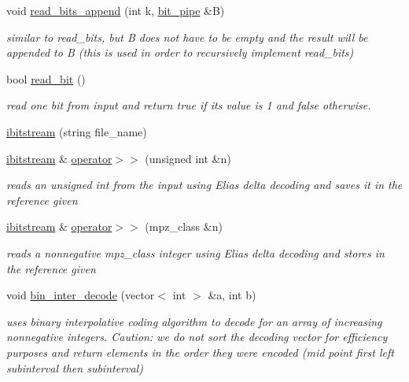 \begin{DoxyCompactItemize}
void \hyperlink{classibitstream_acec2e9efa21551ce8db784f5b0bbd1b5}{read\+\_\+bits\+\_\+append} (int k, \hyperlink{classbit__pipe}{bit\+\_\+pipe} \&B)
\begin{DoxyCompactList}\small\item\em similar to read\+\_\+bits, but B does not have to be empty and the result will be appended to B (this is used in order to recursively implement read\+\_\+bits) \end{DoxyCompactList}\item 
bool \hyperlink{classibitstream_a895239acf7179f6778388c39c97643e4}{read\+\_\+bit} ()
\begin{DoxyCompactList}\small\item\em read one bit from input and return true if its value is 1 and false otherwise. \end{DoxyCompactList}\item 
\hyperlink{classibitstream_af5f00b64072ed3ffe495b7712a71e3eb}{ibitstream} (string file\+\_\+name)
\item 
\hyperlink{classibitstream}{ibitstream} \& \hyperlink{classibitstream_ae3e91ecc9ff17eef98d72d44aec02eca}{operator$>$$>$} (unsigned int \&n)
\begin{DoxyCompactList}\small\item\em reads an unsigned int from the input using Elias delta decoding and saves it in the reference given \end{DoxyCompactList}\item 
\hyperlink{classibitstream}{ibitstream} \& \hyperlink{classibitstream_a0264d01fa1211c4bb73f5de2bc68adbc}{operator$>$$>$} (mpz\+\_\+class \&n)
\begin{DoxyCompactList}\small\item\em reads a nonnegative mpz\+\_\+class integer using Elias delta decoding and stores in the reference given \end{DoxyCompactList}\item 
void \hyperlink{classibitstream_a4d1bfd02f98f6af2ac4d80034b23e26d}{bin\+\_\+inter\+\_\+decode} (vector$<$ int $>$ \&a, int b)
\begin{DoxyCompactList}\small\item\em uses binary interpolative coding algorithm to decode for an array of increasing nonnegative integers. Caution\+: we do not sort the decoding vector for efficiency purposes and return elements in the order they were encoded (mid point first left subinterval then subinterval) \end{DoxyCompactList}\item 

\end{DoxyCompactItemize}
